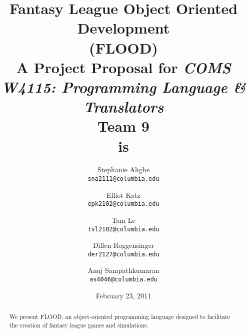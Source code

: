 \documentclass[12pt]{article}
\begin{document}
\title{
\textbf{Fantasy League Object Oriented Development}\\
\textbf{(FLOOD)}\\
{\small A Project Proposal for \textit{COMS W4115: Programming Language \& Translators}}\\
{\large \textbf{Team 9}}\\
\large{\textbf{is}}
}

\author{
  Stephanie Aligbe\\
  \texttt{\small{sna2111@columbia.edu}}
  \and
  Elliot Katz\\
  \texttt{\small{epk2102@columbia.edu}}
  \and
  Tam Le\\
  \texttt{\small{tvl2102@columbia.edu}}
  \and
  Dillen Roggensinger\\
  \texttt{\small{der2127@columbia.edu}}
  \and
  Anuj Sampathkumaran\\
  \texttt{\small{as4046@columbia.edu}}
}

\date{February 23, 2011}

\maketitle

\begin{abstract}
We present FLOOD, an object-oriented programming language designed to facilitate the creation of fantasy league games and simulations. 
\begin{center}

\end{center}
\end{abstract}
\end{document}
